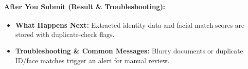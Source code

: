 \paragraph{After You Submit (Result \& Troubleshooting):}
\begin{itemize}[leftmargin=1.5em,itemsep=2pt]
  \item \textbf{What Happens Next:} Extracted identity data and facial match scores are stored with duplicate-check flags.
  \item \textbf{Troubleshooting \& Common Messages:} Blurry documents or duplicate ID/face matches trigger an alert for manual review.
\end{itemize}

